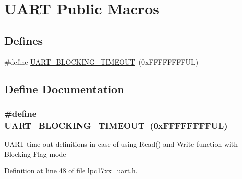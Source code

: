 \hypertarget{group___u_a_r_t___public___macros}{\section{\-U\-A\-R\-T \-Public \-Macros}
\label{group___u_a_r_t___public___macros}
}
\subsection*{\-Defines}
\begin{DoxyCompactItemize}
\item 
\#define \hyperlink{group___u_a_r_t___public___macros_ga98a009d55ad0d99b3f84391f0552faeb}{\-U\-A\-R\-T\-\_\-\-B\-L\-O\-C\-K\-I\-N\-G\-\_\-\-T\-I\-M\-E\-O\-U\-T}~(0x\-F\-F\-F\-F\-F\-F\-F\-F\-U\-L)
\end{DoxyCompactItemize}


\subsection{\-Define \-Documentation}
\hypertarget{group___u_a_r_t___public___macros_ga98a009d55ad0d99b3f84391f0552faeb}{
\subsubsection[{\-U\-A\-R\-T\-\_\-\-B\-L\-O\-C\-K\-I\-N\-G\-\_\-\-T\-I\-M\-E\-O\-U\-T}]{\setlength{\rightskip}{0pt plus 5cm}\#define {\bf \-U\-A\-R\-T\-\_\-\-B\-L\-O\-C\-K\-I\-N\-G\-\_\-\-T\-I\-M\-E\-O\-U\-T}~(0x\-F\-F\-F\-F\-F\-F\-F\-F\-U\-L)}}\label{group___u_a_r_t___public___macros_ga98a009d55ad0d99b3f84391f0552faeb}
\-U\-A\-R\-T time-\/out definitions in case of using \-Read() and \-Write function with \-Blocking \-Flag mode 

\-Definition at line 48 of file lpc17xx\-\_\-uart.\-h.

